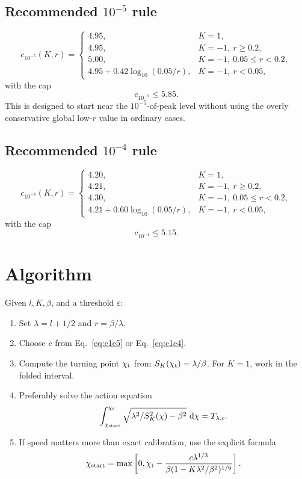 \documentclass[11pt]{article}
\newcommand{\SK}{S_K}
\newcommand{\chip}{\chi_{\rm t}}
\newcommand{\chistart}{\chi_{\rm start}}
\newcommand{\dd}{\,\mathrm{d}}
\begin{document}
\subsection{Recommended \texorpdfstring{\(10^{-5}\)}{1e-5} rule}

\begin{equation}
\boxed{
 c_{10^{-5}}(K,r)=
 \begin{cases}
 4.95, & K=1,\\
 4.95, & K=-1,\ r\ge0.2,\\
 5.00, & K=-1,\ 0.05\le r<0.2,\\
 4.95+0.42\log_{10}(0.05/r), & K=-1,\ r<0.05,
 \end{cases}
}
\label{eq:c1e5}
\end{equation}
with the cap
\[
  c_{10^{-5}}\le5.85.
\]
This is designed to start near the \(10^{-5}\)-of-peak level without using the
overly conservative global low-\(r\) value in ordinary cases.

\subsection{Recommended \texorpdfstring{\(10^{-4}\)}{1e-4} rule}

\begin{equation}
\boxed{
 c_{10^{-4}}(K,r)=
 \begin{cases}
 4.20, & K=1,\\
 4.21, & K=-1,\ r\ge0.2,\\
 4.30, & K=-1,\ 0.05\le r<0.2,\\
 4.21+0.60\log_{10}(0.05/r), & K=-1,\ r<0.05,
 \end{cases}
}
\label{eq:c1e4}
\end{equation}
with the cap
\[
  c_{10^{-4}}\le5.15.
\]

\section{Algorithm}

Given \(l,K,\beta\), and a threshold \(\varepsilon\):
\begin{enumerate}[label=\arabic*.]
\item Set \(\lambda=l+1/2\) and \(r=\beta/\lambda\).
\item Choose \(c\) from Eq.~\eqref{eq:c1e5} or Eq.~\eqref{eq:c1e4}.
\item Compute the turning point \(\chip\) from \(\SK(\chip)=\lambda/\beta\).
      For \(K=1\), work in the folded interval.
\item Preferably solve the action equation
      \[
      \int_{\chistart}^{\chip}
      \sqrt{\lambda^2/\SK^2(\chi)-\beta^2}\,\dd\chi
      =T_{\lambda,c}.
      \]
\item If speed matters more than exact calibration, use the explicit formula
      \[
      \chistart
      =\max\left[0,
      \chip-
      \frac{c\lambda^{1/3}}
      {\beta(1-K\lambda^2/\beta^2)^{1/6}}
      \right].
      \]
\end{enumerate}
\end{document}

